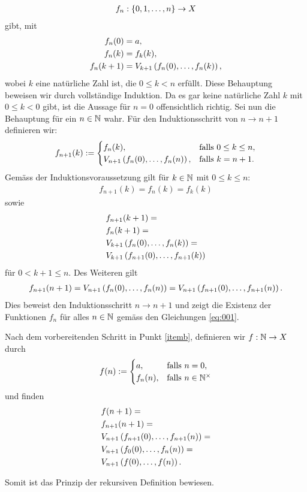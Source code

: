{\begin{aenum}
\begin{align*}
    f_n:\left\{0,1,\ldots,n\right\}\to X
\end{align*}
gibt, mit
\begin{align}\label{eq:001}
    f_n(0) &= a, \nonumber\\
    f_n(k) &= f_k(k), \\
    f_n(k+1) &= V_{k+1}\left(f_n(0),\ldots, f_n(k)\right), \nonumber
\end{align}
wobei $k$ eine natürliche Zahl ist, die $0\leq k < n$ erfüllt. Diese Behauptung beweisen wir durch vollständige Induktion. Da es gar keine natürliche Zahl $k$ mit $0\leq k < 0$ gibt, ist die Aussage für $n=0$ offensichtlich richtig. Sei nun die Behauptung für ein $n\in\mathbb{N}$ wahr. Für den Induktionsschritt von $n\to n+1$ definieren wir:
\begin{align*}
    f_{n+1}(k) :=
    \begin{cases}
    f_n(k), &\text{falls $0\leq k\leq n$}, \\
    V_{n+1}\left(f_n(0),\ldots,f_n(n)\right), &\text{falls $k=n+1$}.
    \end{cases}
\end{align*}
Gemäss der Induktionsvoraussetzung gilt für $k\in\mathbb{N}$ mit $0\leq k\leq n$:
\begin{align*}
    f_{n+1}(k) = f_n(k) = f_k(k)
\end{align*}
sowie
\begin{align*}
    &f_{n+1}(k+1) = \\
    &f_n(k+1) = \\
    &V_{k+1}\left(f_n(0),\ldots, f_n(k)\right) = \\
    &V_{k+1}\left(f_{n+1}(0),\ldots, f_{n+1}(k)\right)
\end{align*}
für $0<k+1\leq n$. Des Weiteren gilt
\begin{align*}
    f_{n+1}(n+1) = V_{n+1}\left(f_n(0),\ldots, f_n(n)\right) = V_{n+1}\left(f_{n+1}(0),\ldots, f_{n+1}(n)\right).
\end{align*}
Dies beweist den Induktionsschritt $n\to n+1$ und zeigt die Existenz der Funktionen $f_n$ für alles $n\in\mathbb{N}$ gemäss den Gleichungen \ref{eq:001}.
\item Nach dem vorbereitenden Schritt in Punkt \ref{itemb}, definieren wir $f:\mathbb{N}\to X$ durch
\begin{align*}
    f(n) :=
    \begin{cases}
    a, &\text{falls $n=0$}, \\
    f_n(n), &\text{falls $n\in\mathbb{N}^{\times}$}
    \end{cases}
\end{align*}
und finden
\begin{align*}
    &f(n+1) = \\
    &f_{n+1}(n+1) = \\
    &V_{n+1}\left(f_{n+1}(0),\ldots,f_{n+1}(n)\right) = \\
    &V_{n+1}\left(f_0(0),\ldots,f_n(n)\right) = \\
    &V_{n+1}\left(f(0),\ldots,f(n)\right).
\end{align*}
\end{aenum}
Somit ist das Prinzip der rekursiven Definition bewiesen. \cite{AmannEscher1}
}

